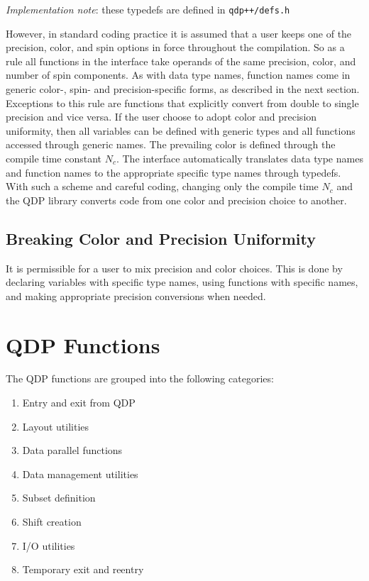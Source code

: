 \documentclass[12pt,letterpaper]{article}
\begin{document}
{\em Implementation note}: these typedefs are defined in  {\tt qdp++/defs.h}

However, in standard coding practice it is assumed that a user keeps
one of the precision, color, and spin options in force throughout the
compilation.  So as a rule all functions in the interface take
operands of the same precision, color, and number of spin
components. As with data type names, function names come in generic
color-, spin- and precision-specific forms, as described in the next
section.  Exceptions to this rule are functions that explicitly
convert from double to single precision and vice versa.  If the user
choose to adopt color and precision uniformity, then all variables can
be defined with generic types and all functions accessed through
generic names.  The prevailing color is defined through
the compile time constant $N_c$.  The interface automatically
translates data type names and function names to the appropriate
specific type names through typedefs.  With such a scheme and careful
coding, changing only the compile time $N_c$ and the QDP library
converts code from one color and precision choice to another.

\subsection{Breaking Color and Precision Uniformity}

It is permissible for a user to mix precision and color choices.  This
is done by declaring variables with specific type names, using
functions with specific names, and making appropriate precision
conversions when needed. 

\newpage 
\section{QDP Functions}

The QDP functions are grouped into the following categories:
\begin{enumerate}
\item Entry and exit from QDP
\item Layout utilities
\item Data parallel functions
\item Data management utilities
\item Subset definition
\item Shift creation
\item I/O utilities
\item Temporary exit and reentry
\end{enumerate}
\end{document}
